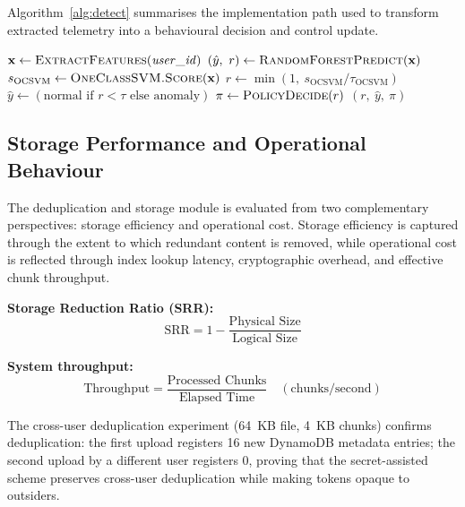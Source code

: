\documentclass[12pt,a4paper,oneside]{report}
\begin{document}
Algorithm~\ref{alg:detect} summarises the implementation path used to transform extracted telemetry into a behavioural decision and control update.

\begin{algorithm}[H]
\caption{Behaviour Detection and Policy Update}
\label{alg:detect}
\begin{algorithmic}[1]
  \State $\mathbf{x} \gets \Call{ExtractFeatures}{\mathit{user\_id}}$
    \State $(\hat{y},\ r) \gets \Call{RandomForestPredict}{\mathbf{x}}$
  \Else
    \State $s_{\mathrm{OCSVM}} \gets \Call{OneClassSVM.Score}{\mathbf{x}}$
    \State $r \gets \min\!\left(1,\ s_{\mathrm{OCSVM}} / \tau_{\mathrm{OCSVM}}\right)$
    \State $\hat{y} \gets (\text{normal if } r < \tau \text{ else anomaly})$
  \EndIf
  \State $\pi \gets \Call{PolicyDecide}{r}$
  \State {}
  \State {}
  \State {}
  \State \Return $(r,\ \hat{y},\ \pi)$
\EndProcedure
\end{algorithmic}
\end{algorithm}

\subsection{Storage Performance and Operational Behaviour}

The deduplication and storage module is evaluated from two complementary perspectives: storage efficiency and operational cost.
Storage efficiency is captured through the extent to which redundant content is removed, while operational cost is reflected through index lookup latency, cryptographic overhead, and effective chunk throughput.

\textbf{Storage Reduction Ratio (SRR):}
\begin{equation}
  \mathrm{SRR} = 1 - \frac{\text{Physical Size}}{\text{Logical Size}}
  \label{eq:srr}
\end{equation}

\textbf{System throughput:}
\begin{equation}
  \text{Throughput} = \frac{\text{Processed Chunks}}{\text{Elapsed Time}} \quad (\text{chunks/second})
  \label{eq:tp}
\end{equation}

The cross-user deduplication experiment (64~KB file, 4~KB chunks) confirms deduplication: the first upload registers 16 new DynamoDB metadata entries; the second upload by a different user registers 0, proving that the secret-assisted scheme preserves cross-user deduplication while making tokens opaque to outsiders.
\end{document}
